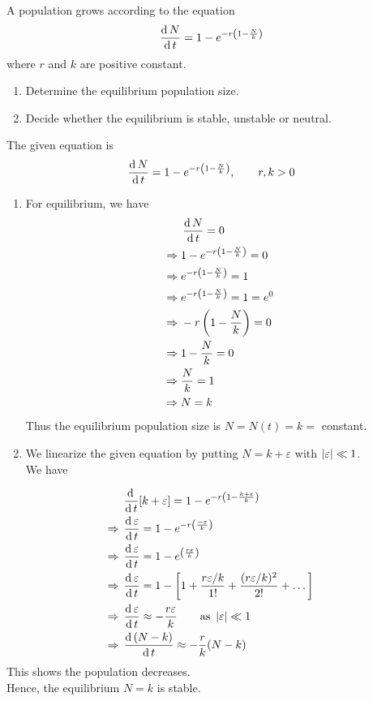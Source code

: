 \documentclass[../main-sheet.tex]{subfiles}
\begin{document}
\begin{prob}
    A population grows according to the equation
    \[\,\frac{\mathrm{d}\,N}{\mathrm{d}\,t}=1-e^{-r\left( 1-\frac{N}{k} \right)}\]
    where \(r\) and \(k\) are positive constant.
    \begin{enumerate}[label=(\roman*)]
        \item Determine the equilibrium population size.
        \item Decide whether the equilibrium is stable, unstable or neutral.
    \end{enumerate}
\end{prob}
\begin{soln}
    The given equation is
    \[\,\frac{\mathrm{d}\,N}{\mathrm{d}\,t}=1-e^{-r\left( 1-\frac{N}{k} \right)},\qquad r,k>0\]
    \begin{enumerate}[label=(\roman*)]
        \item For equilibrium, we have
        \begin{align*}
            &\,\frac{\mathrm{d}\,N}{\mathrm{d}\,t}=0\\
            \Rightarrow\; &1-e^{-r\left( 1-\frac{N}{k} \right)}=0\\
            \Rightarrow\; & e^{-r\left( 1-\frac{N}{k} \right)}=1\\
            \Rightarrow\; & e^{-r\left( 1-\frac{N}{k} \right)}=1=e^0\\
            \Rightarrow\; & -r\left( 1-\frac{N}{k} \right)=0\\
            \Rightarrow\; & 1-\frac{N}{k}=0\\
            \Rightarrow\; & \frac{N}{k}=1\\
            \Rightarrow\; & N=k
        \end{align*}
        Thus the equilibrium population size is \(N=N(t)=k=\) constant.
        \item We linearize the given equation by putting \(N=k+\varepsilon\) with \(\left\vert\varepsilon\right\vert\ll 1\).\\
        We have
    \end{enumerate}
        \begin{align*}
            &\,\frac{\mathrm{d}\,}{\mathrm{d}\,t}[k+\varepsilon]=1-e^{-r\left( 1-\frac{k+\varepsilon}{k} \right)}\\
            \Rightarrow\; &\,\frac{\mathrm{d}\,\varepsilon}{\mathrm{d}\,t}=1-e^{-r\left( \frac{-\varepsilon}{k} \right)}\\
            \Rightarrow\; &\,\frac{\mathrm{d}\,\varepsilon}{\mathrm{d}\,t}=1-e^{\left( \frac{r\varepsilon}{k} \right)}\\
            \Rightarrow\; &\,\frac{\mathrm{d}\,\varepsilon}{\mathrm{d}\,t}=1-\left[ 1+\frac{r \varepsilon/k}{1!}+\frac{(r \varepsilon/k)^2}{2!}+\dots \right]\\
            \Rightarrow\; &\,\frac{\mathrm{d}\,\varepsilon}{\mathrm{d}\,t}\approx -\frac{r\varepsilon}{k}\qquad \text{as }\left\vert\varepsilon\right\vert\ll 1\\
            \Rightarrow\; &\,\frac{\mathrm{d}\,(N-k)}{\mathrm{d}\,t}\approx -\frac{r}{k}(N-k)
        \end{align*}
        This shows the population decreases.\\
        Hence, the equilibrium \(N=k\) is stable.
\end{soln}
\end{document}

